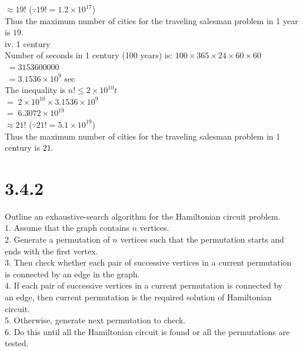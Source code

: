\documentclass{article}
\begin{document}
\indent \indent \indent \indent \indent \indent \indent $\approx 19!$ \indent ($\because 19! = 1.2 \times 10^{17}$) \\
\indent Thus the maximum number of cities for the traveling salesman problem in 1 year is $19$. \\
iv. 1 century \\
\indent Number of seconds in 1 century (100 years) is: $100 \times 365 \times 24 \times 60 \times 60$ \\ 
\indent \indent \indent \indent \indent \indent \indent \indent \indent \indent \indent \indent \indent \indent $\; = 3153600000$ \\
\indent \indent \indent \indent \indent \indent \indent \indent \indent \indent \indent \indent \indent \indent $\; = 3.1536 \times 10^9$ sec \\
\indent The inequality is $n! \le 2 \times 10^{10}t$ \\
\indent \indent \indent \indent \indent \indent \indent $= \; 2 \times 10^{10} \times 3.1536 \times 10^9$ \\
\indent \indent \indent \indent \indent \indent \indent $= \; 6.3072 \times 10^{19}$ \\
\indent \indent \indent \indent \indent \indent \indent $\approx 21!$ \indent ($\because 21! = 5.1 \times 10^{19}$) \\
\indent Thus the maximum number of cities for the traveling salesman problem in 1 century is $21$. 

\section{3.4.2}
Outline an exhaustive-search algorithm for the Hamiltonian circuit problem. \\
1. Assume that the graph contains $n$ vertices. \\
2. Generate a permutation of $n$ vertices such that the permutation starts and \\
\indent ends with the first vertex. \\
3. Then check whether each pair of successive vertices in a current permutation \\
\indent is connected by an edge in the graph. \\
4. If each pair of successive vertices in a current permutation is connected by \\
\indent an edge, then current permutation is the required solution of Hamiltonian \\
\indent circuit. \\
5. Otherwise, generate next permutation to check. \\
6. Do this until all the Hamiltonian circuit is found or all the permutations are \\
\indent tested. 
\end{document}
